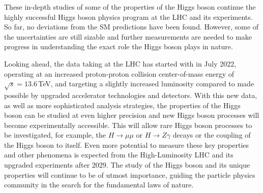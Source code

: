 These in-depth studies of some of the properties of the Higgs boson continue the highly successful Higgs boson physics program at the LHC and its experiments. 
So far, no deviations from the SM predictions have been found. However, some of the uncertainties are still sizable and further measurements are needed to make progress in understanding the exact role the Higgs boson plays in nature. 


Looking ahead, the data taking at the LHC has started with \RunThr in July 2022, operating at an increased proton-proton collision center-of-mass energy of $\sqrt{s} = 13.6\,$TeV, and targeting a slightly increased luminosity compared to \RunTwo made possible by upgraded accelerator technologies and detectors. 
With this new data, as well as more sophisticated analysis strategies, the properties of the Higgs boson can be studied at even higher precision and new Higgs boson processes will become experimentally accessible. 
This will allow rare Higgs boson processes to be investigated, for example, the $H \to \mu\mu$ or $H \to Z\gamma$ decays or the coupling of the Higgs boson to itself.
Even more potential to measure these key properties and other phenomena is expected from the High-Luminosity LHC and its upgraded experiments after 2029.
The study of the Higgs boson and its unique properties will continue to be of utmost importance, guiding the particle physics community in the search for the fundamental laws of nature. 

